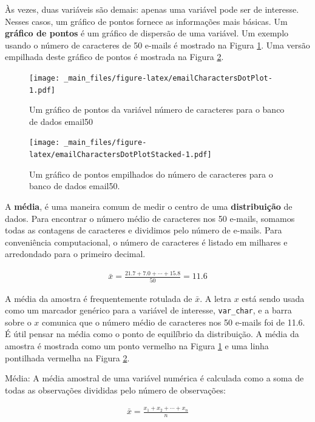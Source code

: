 \documentclass[
]{book}
\theoremstyle{definition}
\theoremstyle{definition}
\theoremstyle{definition}
\theoremstyle{definition}
\theoremstyle{remark}
\begin{document}
Às vezes, duas variáveis são demais: apenas uma variável pode ser de interesse. Nesses casos, um gráfico de pontos fornece as informações mais básicas. Um \textbf{gráfico de pontos} é um gráfico de dispersão de uma variável. Um exemplo usando o número de caracteres de 50 e-mails é mostrado na Figura \ref{fig:emailCharactersDotPlot}. Uma versão empilhada deste gráfico de pontos é mostrada na Figura \ref{fig:emailCharactersDotPlotStacked}.

\begin{figure}
\centering
\texttt{[image: \_main\_files/figure-latex/emailCharactersDotPlot-1.pdf]}
\caption{\label{fig:emailCharactersDotPlot}Um gráfico de pontos da variável número de caracteres para o banco de dados email50}
\end{figure}

\begin{figure}
\centering
\texttt{[image: \_main\_files/figure-latex/emailCharactersDotPlotStacked-1.pdf]}
\caption{\label{fig:emailCharactersDotPlotStacked}Um gráfico de pontos empilhados do número de caracteres para o banco de dados email50.}
\end{figure}

A \textbf{média}, é uma maneira comum de medir o centro de uma \textbf{distribuição} de dados. Para encontrar o número médio de caracteres nos 50 e-mails, somamos todas as contagens de caracteres e dividimos pelo número de e-mails. Para conveniência computacional, o número de caracteres é listado em milhares e arredondado para o primeiro decimal.

\begin{eqnarray}
\bar{x} = \frac{21.7 + 7.0 + \cdots + 15.8}{50} = 11.6
\label{eq:sampleMeanEquation}
\end{eqnarray}

A média da amostra é frequentemente rotulada de \(\bar{x}\). A letra \(x\) está sendo usada como um marcador genérico para a variável de interesse, \texttt{var\_char}, e a barra sobre o \(x\) comunica que o número médio de caracteres nos 50 e-mails foi de 11.6. É útil pensar na média como o ponto de equilíbrio da distribuição. A média da amostra é mostrada como um ponto vermelho na Figura \ref{fig:emailCharactersDotPlot} e uma linha pontilhada vermelha na Figura \ref{fig:emailCharactersDotPlotStacked}.

Média: A média amostral de uma variável numérica é calculada como a soma de todas as observações divididas pelo número de observações:

\begin{eqnarray}
\bar{x} = \frac{x_1+x_2+\cdots+x_n}{n}
\label{eq:meanEquation}
\end{eqnarray}
\end{document}

